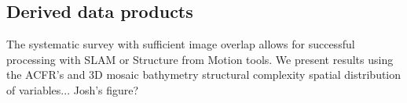 \subsection{Derived data products}
The systematic survey with sufficient image overlap allows for successful processing with SLAM or Structure from Motion tools. We present results using the ACFR's \cite{Mahon_2008} and \cite{Johnson_Roberson_2010}\cite{Johnson_Roberson_2010}
3D mosaic
bathymetry
structural complexity
spatial distribution of variables... Josh's figure?
